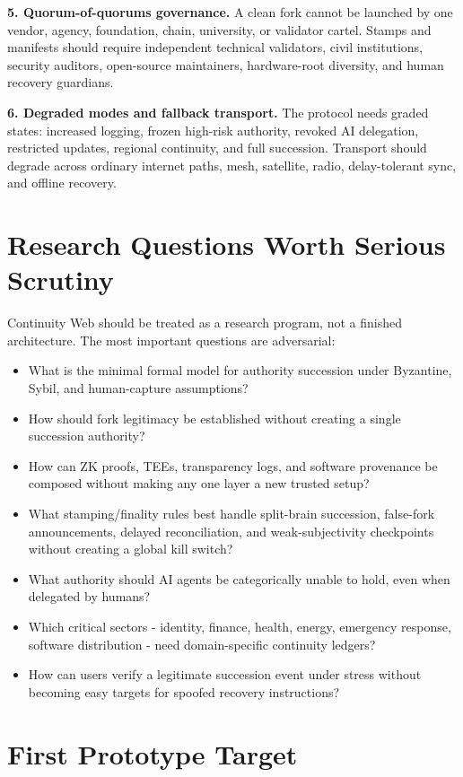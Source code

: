 \documentclass[10pt,letterpaper,twocolumn]{article}
\begin{document}
\textbf{5. Quorum-of-quorums governance.} A clean fork cannot be launched by one vendor, agency, foundation, chain, university, or validator cartel. Stamps and manifests should require independent technical validators, civil institutions, security auditors, open-source maintainers, hardware-root diversity, and human recovery guardians.

\textbf{6. Degraded modes and fallback transport.} The protocol needs graded states: increased logging, frozen high-risk authority, revoked AI delegation, restricted updates, regional continuity, and full succession. Transport should degrade across ordinary internet paths, mesh, satellite, radio, delay-tolerant sync, and offline recovery.

\section{Research Questions Worth Serious Scrutiny}

Continuity Web should be treated as a research program, not a finished architecture. The most important questions are adversarial:

\begin{itemize}
  \item What is the minimal formal model for authority succession under Byzantine, Sybil, and human-capture assumptions?
  \item How should fork legitimacy be established without creating a single succession authority?
  \item How can ZK proofs, TEEs, transparency logs, and software provenance be composed without making any one layer a new trusted setup?
  \item What stamping/finality rules best handle split-brain succession, false-fork announcements, delayed reconciliation, and weak-subjectivity checkpoints without creating a global kill switch?
  \item What authority should AI agents be categorically unable to hold, even when delegated by humans?
  \item Which critical sectors - identity, finance, health, energy, emergency response, software distribution - need domain-specific continuity ledgers?
  \item How can users verify a legitimate succession event under stress without becoming easy targets for spoofed recovery instructions?
\end{itemize}

\section{First Prototype Target}
\end{document}
